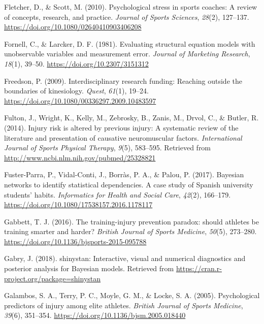 \documentclass[
  english,
  man,floatsintext]{apa6}
\begin{document}
\leavevmode\hypertarget{ref-Fletcher2010}{}%
Fletcher, D., \& Scott, M. (2010). Psychological stress in sports coaches: A review of concepts, research, and practice. \emph{Journal of Sports Sciences}, \emph{28}(2), 127--137. \url{https://doi.org/10.1080/02640410903406208}

\leavevmode\hypertarget{ref-Fornell1981}{}%
Fornell, C., \& Larcker, D. F. (1981). Evaluating structural equation models with unobservable variables and measurement error. \emph{Journal of Marketing Research}, \emph{18}(1), 39--50. \url{https://doi.org/10.2307/3151312}

\leavevmode\hypertarget{ref-Freedson2009}{}%
Freedson, P. (2009). Interdisciplinary research funding: Reaching outside the boundaries of kinesiology. \emph{Quest}, \emph{61}(1), 19--24. \url{https://doi.org/10.1080/00336297.2009.10483597}

\leavevmode\hypertarget{ref-Fulton2014}{}%
Fulton, J., Wright, K., Kelly, M., Zebrosky, B., Zanis, M., Drvol, C., \& Butler, R. (2014). Injury risk is altered by previous injury: A systematic review of the literature and presentation of causative neuromuscular factors. \emph{International Journal of Sports Physical Therapy}, \emph{9}(5), 583--595. Retrieved from \url{http://www.ncbi.nlm.nih.gov/pubmed/25328821}

\leavevmode\hypertarget{ref-Fuster-Parra2017}{}%
Fuster-Parra, P., Vidal-Conti, J., Borràs, P. A., \& Palou, P. (2017). Bayesian networks to identify statistical dependencies. A case study of Spanish university students' habits. \emph{Informatics for Health and Social Care}, \emph{42}(2), 166--179. \url{https://doi.org/10.1080/17538157.2016.1178117}

\leavevmode\hypertarget{ref-Gabbett2016}{}%
Gabbett, T. J. (2016). The training-injury prevention paradox: should athletes be training smarter and harder? \emph{British Journal of Sports Medicine}, \emph{50}(5), 273--280. \url{https://doi.org/10.1136/bjsports-2015-095788}

\leavevmode\hypertarget{ref-Gabry2018}{}%
Gabry, J. (2018). shinystan: Interactive, visual and numerical diagnostics and posterior analysis for Bayesian models. Retrieved from \url{https://cran.r-project.org/package=shinystan}

\leavevmode\hypertarget{ref-Galambos2005}{}%
Galambos, S. A., Terry, P. C., Moyle, G. M., \& Locke, S. A. (2005). Psychological predictors of injury among elite athletes. \emph{British Journal of Sports Medicine}, \emph{39}(6), 351--354. \url{https://doi.org/10.1136/bjsm.2005.018440}
\end{document}
